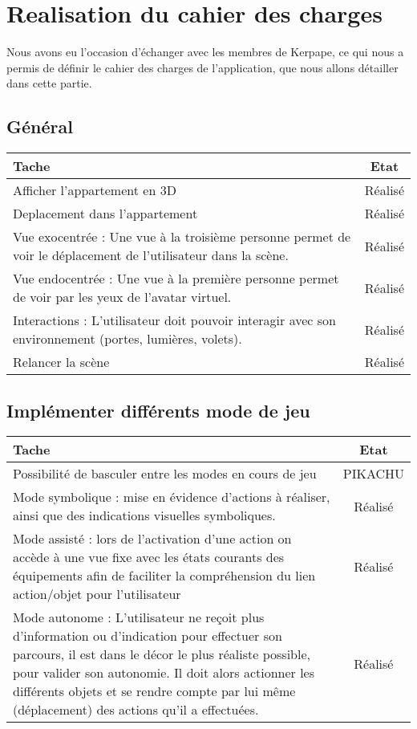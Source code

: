\section{Realisation du cahier des charges}
Nous avons eu l'occasion d'échanger avec les membres de Kerpape, ce qui nous a permis de définir le cahier des charges de l'application, que nous allons détailler dans cette partie. \\

\subsection{Général}

\begin{tabular}{|p{13cm}|c|}
	\hline
	Tache & Etat \\ \hline
	Afficher l'appartement en 3D & Réalisé \\ \hline
	Deplacement dans l'appartement & Réalisé \\ \hline
	Vue exocentrée : Une vue à la troisième personne permet de voir le déplacement de l'utilisateur dans la scène. & Réalisé \\ \hline
	Vue endocentrée : Une vue à la première personne permet de voir par les yeux de l'avatar  virtuel. & Réalisé \\ \hline
	Interactions : L'utilisateur doit pouvoir interagir avec son environnement (portes, lumières, volets). & Réalisé \\ \hline
	Relancer la scène & Réalisé \\ \hline
\end{tabular}
	
\subsection{Implémenter différents mode de jeu}
\begin{tabular}{|p{13cm}|c|}
	\hline
	Tache & Etat \\ \hline
	Possibilité de basculer entre les modes en cours de jeu & PIKACHU \\ \hline
	Mode symbolique : mise en évidence d'actions à réaliser, ainsi que des indications visuelles symboliques. & Réalisé \\ \hline
	Mode assisté : lors de l'activation d'une action on accède à une vue fixe avec les états courants des équipements afin de faciliter la compréhension du lien action/objet pour l'utilisateur & Réalisé \\ \hline
	Mode autonome : L'utilisateur ne reçoit plus d'information ou d'indication pour effectuer son parcours, il est dans le décor le plus réaliste possible, pour valider son autonomie. Il doit alors actionner les différents objets et se rendre compte par lui même (déplacement) des actions qu'il a effectuées.  & Réalisé \\ \hline
\end{tabular}
		

